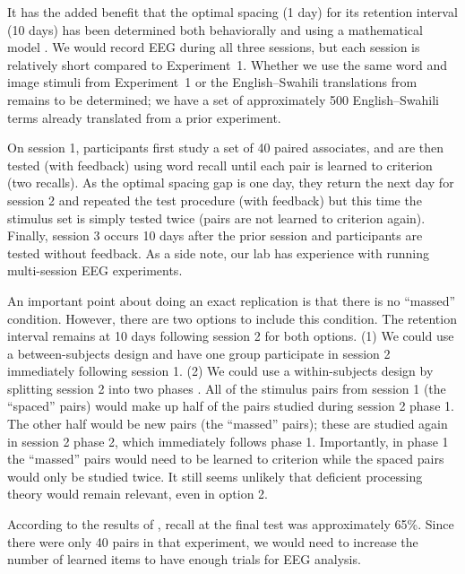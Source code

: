 It has the added benefit that the optimal spacing (1 day) for its retention interval (10 days) has been determined both behaviorally \cite{CepeEtal2009} and using a mathematical model \cite{MozeEtal2009}.  We would record EEG during all three sessions, but each session is relatively short compared to Experiment~1.  Whether we use the same word and image stimuli from Experiment~1 or the English--Swahili translations from  remains to be determined; we have a set of approximately 500 English--Swahili terms already translated from a prior experiment.

On session 1, participants first study a set of 40 paired associates, and are then tested (with feedback) using word recall until each pair is learned to criterion (two recalls).  As the optimal spacing gap is one day, they return the next day for session 2 and repeated the test procedure (with feedback) but this time the stimulus set is simply tested twice (pairs are not learned to criterion again).  Finally, session 3 occurs 10 days after the prior session and participants are tested without feedback.
As a side note, our lab has experience with running multi-session EEG experiments.

An important point about doing an exact replication is that there is no ``massed'' condition.  However, there are two options to include this condition.  The retention interval remains at 10 days following session 2 for both options.  (1) We could use a between-subjects design and have one group participate in session 2 immediately following session 1.  (2) We could use a within-subjects design by splitting session 2 into two phases \cite<similar to the design of>{WagnEtal2000}.  All of the stimulus pairs from session 1 (the ``spaced'' pairs) would make up half of the pairs studied during session 2 phase 1.  The other half would be new pairs (the ``massed'' pairs); these are studied again in session 2 phase 2, which immediately follows phase 1.  Importantly, in phase 1 the ``massed'' pairs would need to be learned to criterion while the spaced pairs would only be studied twice.  It still seems unlikely that deficient processing theory would remain relevant, even in option 2.

According to the results of , recall at the final test was approximately 65\%.  Since there were only 40 pairs in that experiment, we would need to increase the number of learned items to have enough trials for EEG analysis.

